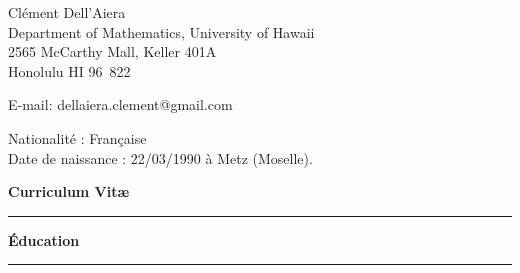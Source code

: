 \documentclass[a4paper,11pt]{article}
\newcommand{\titre}[1]{%
	\begin{center}
	\bigskip
	\rule{\textwidth}{1pt}
	\par\vspace{0.1cm}
        \textbf{\large #1}
	\par\rule{\textwidth}{1pt}
	\end{center}
	\bigskip
	}
\begin{document}
\begin{flushleft}
Clément Dell'Aiera \\
Department of Mathematics, University of Hawaii\\
2565 McCarthy Mall, Keller 401A \\
Honolulu HI 96\ 822 \\

\medskip

E-mail: dellaiera.clement@gmail.com


\end{flushleft}
\begin{flushleft}
Nationalit\'e : Fran\c{c}aise \\
Date de naissance : 22/03/1990 \`a Metz (Moselle).
\end{flushleft}

\vspace{1.5cm}
\begin{center}
\par\huge{\textbf{Curriculum Vit\ae} }
\end{center}

\titre{\'Education}
\end{document}
